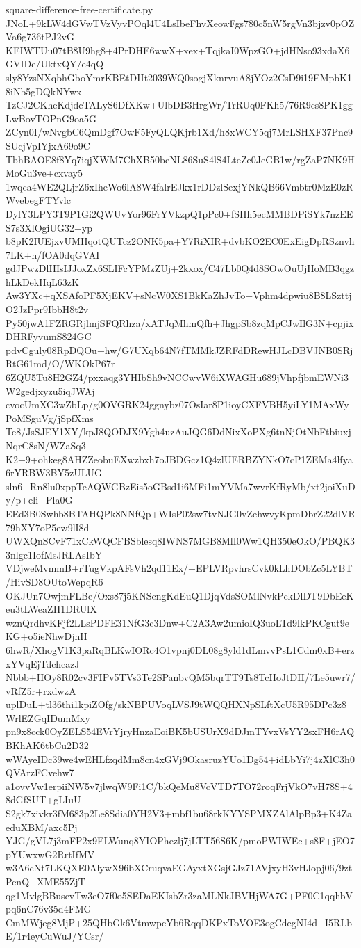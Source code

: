 \documentclass[11pt]{article}
\theoremstyle{definition}
\theoremstyle{remark}
\begin{document}
\begin{filecontents*}[overwrite]{square-difference-free-certificate.py}
JNoL+9kLW4dGVwTVzVyvPOql4U4LsIbeFhvXeowFgs780c5nW5rgVn3bjzv0pOZVa6g736tPJ2vG
KEIWTUu07tB8U9hg8+4PrDHE6wwX+xex+TqjkaI0WpzGO+jdHNso93xdaX6GVIDe/UktxQY/e4qQ
sly8YzsNXqbhGboYmrKBEtDIIt2039WQ0sogjXknrvuA8jYOz2CsD9i19EMpbK18iNb5gDQkNYwx
TzCJ2CKheKdjdcTALyS6DfXKw+UlbDB3HrgWr/TrRUq0FKh5/76R9cs8PK1ggLwBovTOPnG9oa5G
ZCyn0I/wNvgbC6QmDgf7OwF5FyQLQKjrb1Xd/h8xWCY5qj7MrLSHXF37Pnc9SUcjVpIYjxA69o9C
TbhBAOE8f8Yq7iqjXWM7ChXB50beNL86SuS4lS4LteZe0JeGB1w/rgZaP7NK9HMoGu3ve+cxvay5
1wqca4WE2QLjrZ6xIheWo6lA8W4falrEJkx1rDDzlSexjYNkQB66Vmbtr0MzE0zRWvebegFTYvlc
DylY3LPY3T9P1Gi2QWUvYor96FrYVkzpQ1pPc0+fSHh5ecMMBDPiSYk7nzEES7s3XlOgiUG32+yp
b8pK2IUEjxvUMHqotQUTcz2ONK5pa+Y7RiXIR+dvbKO2EC0ExEigDpRSznvh7LK+n/fOA0dqGVAI
gdJPwzDlHIsIJJoxZx6SLIFcYPMzZUj+2kxox/C47Lb0Q4d8SOwOuUjHoMB3qgzhLkDekHqL63zK
Aw3YXc+qXSAfoPF5XjEKV+sNcW0XS1BkKaZhJvTo+Vphm4dpwiu8B8LSzttjO2JzPpr9IbbH8t2v
Py50jwA1FZRGRjlmjSFQRhza/xATJqMhmQfh+JhgpSb8zqMpCJwIlG3N+cpjixDHRFyvumS824GC
pdvCguly08RpDQOu+hw/G7UXqb64N7fTMMkJZRFdDRewHJLcDBVJNB0SRjRtG61md/O/WKOkP67r
6ZQU5Tu8H2GZ4/pxxaqg3YHIbSh9vNCCwvW6iXWAGHu689jVhpfjbmEWNi3W2gedjxyzu5iqJWAj
cvocUmXC3wZbLp/g0OVGRK24ggnybz07OsIar8P1ioyCXFVBH5yiLY1MAxWyPoMSguVg/jSpfXms
Te8/JsSJEY1XY/kpJ8QODJX9Ygh4uzAuJQG6DdNixXoPXg6tnNjOtNbFtbiuxjNqrC8sN/WZaSq3
K2+9+ohkeg8AHZZeobuEXwzbxh7oJBDGcz1Q4zlUERBZYNkO7cP1ZEMa4lfya6rYRBW3BY5zULUG
sln6+Rn8lu0xppTeAQWGBzEis5oGBsd1i6MFi1mYVMa7wvrKfRyMb/xt2joiXuDy/p+eli+Pla0G
EEd3B0Swhb8BTAHQPk8NNfQp+WIsP02sw7tvNJG0vZehwvyKpmDbrZ22dlVR79hXY7oP5ew9lI8d
UWXQnSCvF71xCkWQCFBSblesq8IWNS7MGB8MlI0Ww1QH350eOkO/PBQK33nlgc1IofMsJRLAsIbY
VDjweMvmmB+rTugVkpAFsVh2qd11Ex/+EPLVRpvhrsCvk0kLhDObZc5LYBT/HivSD8OUtoWepqR6
OKJUn7OwjmFLBe/Oxs87j5KNScngKdEuQ1DjqVdsSOMlNvkPckDlDT9DbEeKeu3tLWeaZH1DRUlX
wznQrdhvKFjf2LLsPDFE31NfG3c3Dnw+C2A3Aw2umioIQ3uoLTd9lkPKCgut9eKG+o5ieNhwDjnH
6hwR/XhogV1K3paRqBLKwIORc4O1vpnj0DL08g8yld1dLmvvPsL1Cdm0xB+erzxYVqEjTdchcazJ
Nbbb+HOy8R02cv3FIPv5TVs3Te2SPanbvQM5bqrTT9Ts8TcHoJtDH/7Le5uwr7/vRfZ5r+rxdwzA
uplDuL+tl36thi1kpiZOfg/skNBPUVoqLVSJ9tWQQHXNpSLftXcU5R95DPc3z8WrlEZGqIDumMxy
pn9x8cck0OyZELS54EVrYjryHnzaEoiBK5bUSUrX9dDJmTYvxVsYY2sxFH6rAQBKhAK6tbCu2D32
wWAyeIDc39we4wEHLfzqdMm8cn4xGVj9OkasruzYUo1Dg54+idLbYi7j4zXlC3h0QVArzFCvehw7
a1ovvVw1erpiiNW5v7jlwqW9Fi1C/bkQeMu8VcVTD7TO72roqFrjVkO7vH78S+48dGfSUT+gLIuU
S2gk7xivkr3fM683p2Le8Sdia0YH2V3+mbf1bu68rkKYYSPMXZAlAlpBp3+K4ZaeduXBM/axc5Pj
YJG/gVL7j3mFP2x9ELWunq8YIOPhezlj7jLTT56S6K/pmoPWIWEc+s8F+jEO7pYUwxwG2RrtIfMV
w3A6cNt7LKQXE0AlywX96bXCruqvaEGAyxtXGsjGJz71AVjxyH3vHJopj06/9ztPenQ+XME55ZjT
qg1MvlgBBusevTw3eO7f0o5SEDaEKIsbZr3zaMLNkJBVHjWA7G+PF0C1qqhbVpq6nC76v35d4FMG
CmMWjeg8MjP+25QHbGk6VtmwpcYb6RqqDKPxToVOE3ogCdegNI4d+I5RLbE/1r4eyCuWuJ/YCsr/

\end{filecontents*}
\end{document}
